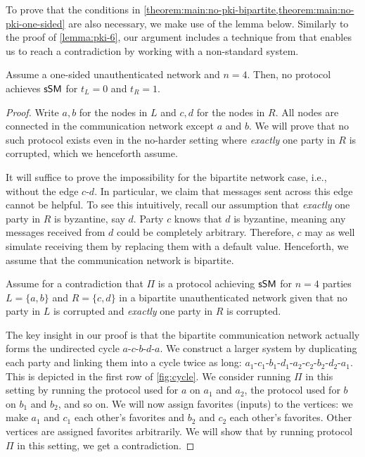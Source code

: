 To prove that the conditions in \cref{theorem:main:no-pki-bipartite,theorem:main:no-pki-one-sided} are also necessary, we make use of the lemma below. Similarly to the proof of \cref{lemma:pki-6}, our argument includes a technique from \cite{PODC:FisLynMer85} that enables us to reach a contradiction by working with a non-standard system.
\begin{lemma} \label{lemma:pki-4}
Assume a one-sided unauthenticated network and $n = 4$. Then, no protocol achieves $\textsf{sSM}$ for $t_L = 0$ and $t_R = 1$.
\end{lemma}
\begin{proof}
Write $a, b$ for the nodes in $L$ and $c, d$ for the nodes in $R$. All nodes are connected in the communication network except $a$ and $b$. We will prove that no such protocol exists even in the no-harder setting where \emph{exactly} one party in $R$ is corrupted, which we henceforth assume.

It will suffice to prove the impossibility for the bipartite network case, i.e., without the edge $c$-$d$.
In particular, we claim that messages sent across this edge cannot be helpful. To see this intuitively, recall our assumption that \emph{exactly} one party in $R$ is byzantine, say $d$. Party $c$ knows that $d$ is byzantine, meaning any messages received from $d$ could be completely arbitrary. Therefore, $c$ may as well simulate receiving them by replacing them with a default value. Henceforth, we assume that the communication network is bipartite.

Assume for a contradiction that $\Pi$ is a protocol achieving $\textsf{sSM}$ for $n = 4$ parties $L = \{a, b\}$ and $R = \{c, d\}$ in a bipartite unauthenticated network given that no party in $L$ is corrupted and \emph{exactly} one party in $R$ is corrupted. 

The key insight in our proof is that the bipartite communication network actually forms the undirected cycle $a$-$c$-$b$-$d$-$a$. We construct a larger system by duplicating each party and linking them into a cycle twice as long: $a_1$-$c_1$-$b_1$-$d_1$-$a_2$-$c_2$-$b_2$-$d_2$-$a_1$. This is depicted in the first row of \cref{fig:cycle}.
We consider running $\Pi$ in this setting by running the protocol used for $a$ on $a_1$ and $a_2$, the protocol used for $b$ on $b_1$ and $b_2$, and so on. We will now assign favorites (inputs) to the vertices: we make $a_1$ and $c_1$ each other's favorites and $b_2$ and $c_2$ each other's favorites. Other vertices are assigned favorites arbitrarily. We will show that by running protocol $\Pi$ in this setting, we get a contradiction.


\end{proof}
